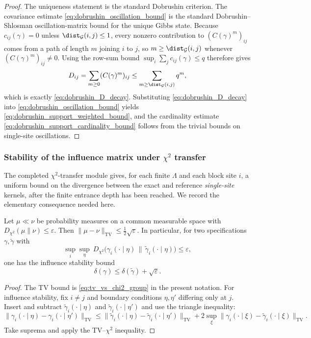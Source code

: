 \begin{proof}
The uniqueness statement is the standard Dobrushin criterion.
The covariance estimate \eqref{eq:dobrushin_oscillation_bound} is the standard Dobrushin--Shlosman oscillation-matrix bound for the unique Gibbs state.
Because $c_{ij}(\gamma)=0$ unless $\dist_{\mathcal G}(i,j)\le 1$, every nonzero contribution to $(C(\gamma)^m)_{ij}$ comes from a path of length $m$ joining $i$ to $j$, so $m\ge \dist_{\mathcal G}(i,j)$ whenever $(C(\gamma)^m)_{ij}\neq 0$.
Using the row-sum bound $\sup_i\sum_j c_{ij}(\gamma)\le q$ therefore gives
\[
D_{ij}
=\sum_{m\ge0}(C(\gamma)^m)_{ij}
\le\sum_{m\ge \dist_{\mathcal G}(i,j)} q^m,
\]
which is exactly \eqref{eq:dobrushin_D_decay}.
Substituting \eqref{eq:dobrushin_D_decay} into \eqref{eq:dobrushin_oscillation_bound} yields \eqref{eq:dobrushin_support_weighted_bound}, and the cardinality estimate \eqref{eq:dobrushin_support_cardinality_bound} follows from the trivial bounds on single-site oscillations.
\end{proof}

\subsubsection{Stability of the influence matrix under \texorpdfstring{$\chi^2$}{chi2} transfer}

The completed $\chi^2$-transfer module gives, for each finite $\Lambda$ and each block site $i$,
a uniform bound on the divergence between the exact and reference \emph{single-site} kernels, after the finite
entrance depth has been reached. We record the elementary consequence needed here.

\begin{lemma}\label{lem:chi2_to_influence}
Let $\mu\ll\nu$ be probability measures on a common measurable space with
$D_{\chi^2}(\mu\|\nu)\le \varepsilon$. Then $\|\mu-\nu\|_{\mathrm{TV}}\le \tfrac12\sqrt{\varepsilon}$.
In particular, for two specifications $\gamma,\tilde\gamma$ with
\[
\sup_{i}\sup_{\eta}\ D_{\chi^2}\bigl(\gamma_i(\cdot\mid\eta)\,\|\,\tilde\gamma_i(\cdot\mid\eta)\bigr)\le \varepsilon,
\]
one has the influence stability bound
\[
\delta(\gamma)\le \delta(\tilde\gamma)+\sqrt{\varepsilon}.
\]
\end{lemma}

\begin{proof}
The TV bound is \eqref{eq:tv_vs_chi2_group} in the present notation.
For influence stability, fix $i\neq j$ and boundary conditions $\eta,\eta'$ differing only at $j$.
Insert and subtract $\tilde\gamma_i(\cdot\mid\eta)$ and $\tilde\gamma_i(\cdot\mid\eta')$ and use the triangle inequality:
\[
\|\gamma_i(\cdot\mid\eta)-\gamma_i(\cdot\mid\eta')\|_{\mathrm{TV}}
\le
\|\tilde\gamma_i(\cdot\mid\eta)-\tilde\gamma_i(\cdot\mid\eta')\|_{\mathrm{TV}}
+2\sup_{\xi}\|\gamma_i(\cdot\mid\xi)-\tilde\gamma_i(\cdot\mid\xi)\|_{\mathrm{TV}}.
\]
Take suprema and apply the TV--$\chi^2$ inequality.
\end{proof}

